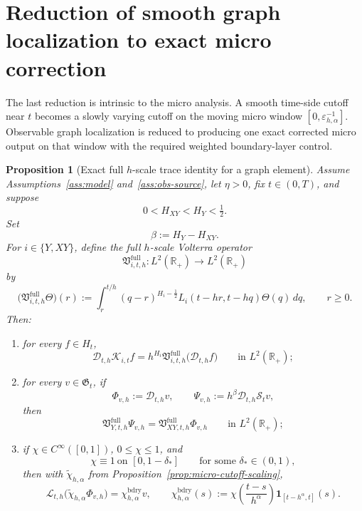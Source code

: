 \documentclass[11pt,a4paper]{amsart}
\theoremstyle{plain}
\newtheorem{proposition}[theorem]{Proposition}
\theoremstyle{definition}
\theoremstyle{remark}
\newcommand{\R}{\mathbb{R}}
\newcommand{\one}{\mathbf 1}
\begin{document}
\section{Reduction of smooth graph localization to exact micro correction}
\label{sec:smooth-cutoff-reduction}

The last reduction is intrinsic to the micro analysis.  A smooth time-side cutoff near \(t\) becomes
a slowly varying cutoff on the moving micro window \([0,\varepsilon_{h,\alpha}^{-1}]\).  Observable
graph localization is reduced to producing one exact corrected micro output on that window with the
required weighted boundary-layer control.

\begin{proposition}[Exact full \(h\)-scale trace identity for a graph element]
\label{prop:full-h-trace}
Assume Assumptions~\ref{ass:model} and~\ref{ass:obs-source}, let \(\eta>0\), fix \(t\in(0,T)\),
and suppose
\[
0<H_{XY}<H_Y<\tfrac12.
\]
Set
\[
\beta:=H_Y-H_{XY}.
\]
For \(i\in\{Y,XY\}\), define the full \(h\)-scale Volterra operator
\[
\mathfrak V_{i,t,h}^{\mathrm{full}}:L^2(\R_+)\to L^2(\R_+)
\]
by
\begin{equation}\label{eq:full-h-volterra}
\bigl(
\mathfrak V_{i,t,h}^{\mathrm{full}}\Theta
\bigr)(r)
:=
\int_r^{t/h}
(q-r)^{H_i-\frac12}
L_i(t-hr,t-hq)\Theta(q)\,dq,
\qquad r\ge0.
\end{equation}
Then:
\begin{enumerate}[label=(\roman*)]
\item for every \(f\in H_t\),
\begin{equation}\label{eq:full-h-representation}
\mathcal D_{t,h}\mathcal K_{i,t}f
=
h^{H_i}
\mathfrak V_{i,t,h}^{\mathrm{full}}
\bigl(
\mathcal D_{t,h}f
\bigr)
\qquad\text{in }L^2(\R_+);
\end{equation}
\item for every \(v\in \mathfrak G_t\), if
\begin{equation}\label{eq:full-h-traces}
\Phi_{v,h}:=\mathcal D_{t,h}v,
\qquad
\Psi_{v,h}:=h^\beta \mathcal D_{t,h}\mathcal S_t v,
\end{equation}
then
\begin{equation}\label{eq:full-h-exact}
\mathfrak V_{Y,t,h}^{\mathrm{full}}\Psi_{v,h}
=
\mathfrak V_{XY,t,h}^{\mathrm{full}}\Phi_{v,h}
\qquad\text{in }L^2(\R_+);
\end{equation}
\item if \(\chi\in C^\infty([0,1])\), \(0\le \chi\le1\), and
\[
\chi\equiv1\ \text{on }[0,1-\delta_*]
\qquad\text{for some }\delta_*\in(0,1),
\]
then with \(\widetilde\chi_{h,\alpha}\) from Proposition~\ref{prop:micro-cutoff-scaling},
\begin{equation}\label{eq:full-h-time-cutoff}
\mathcal L_{t,h}
\bigl(
\widetilde\chi_{h,\alpha}\Phi_{v,h}
\bigr)
=
\chi_{h,\alpha}^{\mathrm{bdry}}v,
\qquad
\chi_{h,\alpha}^{\mathrm{bdry}}(s)
:=
\chi\!\left(\frac{t-s}{h^\alpha}\right)\one_{[t-h^\alpha,t]}(s).
\end{equation}
\end{enumerate}
\end{proposition}
\end{document}
